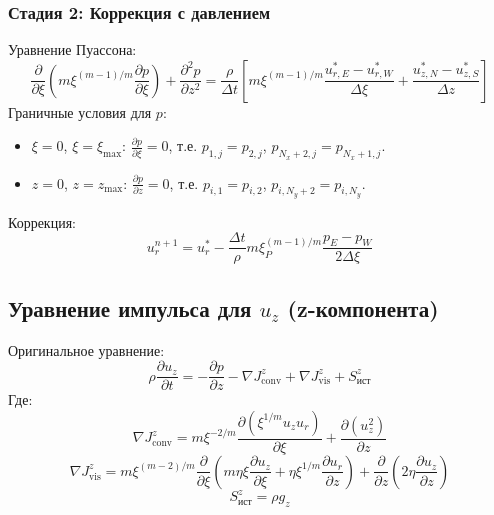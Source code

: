 \documentclass[a4paper,12pt]{article}
\begin{document}
\subsubsection*{Стадия 2: Коррекция с давлением}
Уравнение Пуассона:
\[
\frac{\partial}{\partial \xi} \left( m \xi^{(m-1)/m} \frac{\partial p}{\partial \xi} \right) + \frac{\partial^2 p}{\partial z^2} = \frac{\rho}{\Delta t} \left[ m \xi^{(m-1)/m} \frac{u_{r,E}^* - u_{r,W}^*}{\Delta \xi} + \frac{u_{z,N}^* - u_{z,S}^*}{\Delta z} \right]
\]
Граничные условия для \(p\):
\begin{itemize}
    \item \(\xi = 0\), \(\xi = \xi_{\text{max}}\): \(\frac{\partial p}{\partial \xi} = 0\), т.е. \(p_{1,j} = p_{2,j}\), \(p_{N_x+2,j} = p_{N_x+1,j}\).
    \item \(z = 0\), \(z = z_{\text{max}}\): \(\frac{\partial p}{\partial z} = 0\), т.е. \(p_{i,1} = p_{i,2}\), \(p_{i,N_y+2} = p_{i,N_y}\).
\end{itemize}
Коррекция:
\[
u_r^{n+1} = u_r^* - \frac{\Delta t}{\rho} m \xi_P^{(m-1)/m} \frac{p_E - p_W}{2 \Delta \xi}
\]

\subsection*{Уравнение импульса для \(u_z\) (z-компонента)}
Оригинальное уравнение:
\[
\rho \frac{\partial u_z}{\partial t} = - \frac{\partial p}{\partial z} - \nabla J_{\text{conv}}^z + \nabla J_{\text{vis}}^z + S_{\text{ист}}^z
\]
Где:
\[
\nabla J_{\text{conv}}^z = m \xi^{-2/m} \frac{\partial (\xi^{1/m} u_z u_r)}{\partial \xi} + \frac{\partial (u_z^2)}{\partial z}
\]
\[
\nabla J_{\text{vis}}^z = m \xi^{(m-2)/m} \frac{\partial}{\partial \xi} \left( m \eta \xi \frac{\partial u_z}{\partial \xi} + \eta \xi^{1/m} \frac{\partial u_r}{\partial z} \right) + \frac{\partial}{\partial z} \left( 2 \eta \frac{\partial u_z}{\partial z} \right)
\]
\[
S_{\text{ист}}^z = \rho g_z
\]
\end{document}
